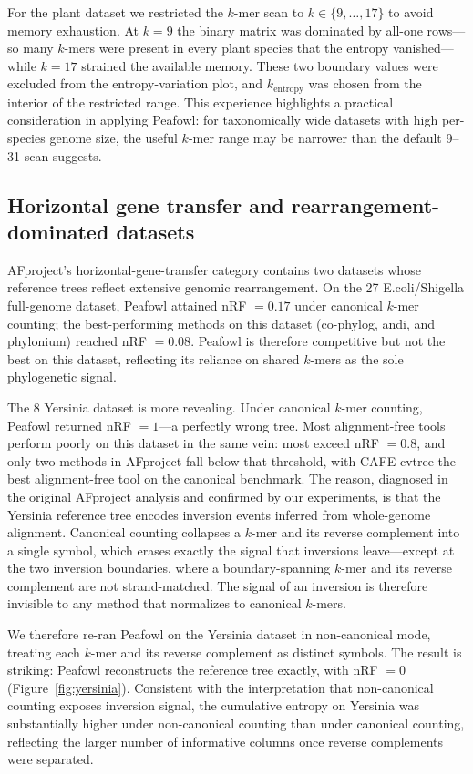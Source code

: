 \documentclass[11pt]{article}
\begin{document}
For the plant dataset we restricted the $k$-mer scan to $k \in \{9, \ldots, 17\}$
to avoid memory exhaustion. At $k = 9$ the binary matrix was dominated by
all-one rows---so many $k$-mers were present in every plant species that
the entropy vanished---while $k = 17$ strained the available memory. These
two boundary values were excluded from the entropy-variation plot, and
$k_\mathrm{entropy}$ was chosen from the interior of the restricted range.
This experience highlights a practical consideration in applying Peafowl:
for taxonomically wide datasets with high per-species genome size, the
useful $k$-mer range may be narrower than the default 9--31 scan suggests.

\subsection{Horizontal gene transfer and rearrangement-dominated datasets}

AFproject's horizontal-gene-transfer category contains two datasets whose
reference trees reflect extensive genomic rearrangement. On the 27
E.coli/Shigella full-genome dataset, Peafowl attained nRF $= 0.17$ under
canonical $k$-mer counting; the best-performing methods on this dataset
(co-phylog, andi, and phylonium) reached nRF $= 0.08$. Peafowl is therefore
competitive but not the best on this dataset, reflecting its reliance on
shared $k$-mers as the sole phylogenetic signal.

The 8 Yersinia dataset is more revealing. Under canonical $k$-mer counting,
Peafowl returned nRF $= 1$---a perfectly wrong tree. Most alignment-free
tools perform poorly on this dataset in the same vein: most exceed
nRF $= 0.8$, and only two methods in AFproject fall below that threshold,
with CAFE-cvtree the best alignment-free tool on the canonical benchmark.
The reason, diagnosed in the original AFproject analysis and confirmed by
our experiments, is that the Yersinia reference tree encodes inversion
events inferred from whole-genome alignment. Canonical counting collapses
a $k$-mer and its reverse complement into a single symbol, which erases
exactly the signal that inversions leave---except at the two inversion
boundaries, where a boundary-spanning $k$-mer and its reverse complement
are not strand-matched. The signal of an inversion is therefore invisible
to any method that normalizes to canonical $k$-mers.

We therefore re-ran Peafowl on the Yersinia dataset in non-canonical mode,
treating each $k$-mer and its reverse complement as distinct symbols. The
result is striking: Peafowl reconstructs the reference tree exactly, with
nRF $= 0$ (Figure~\ref{fig:yersinia}). Consistent with the interpretation
that non-canonical counting exposes inversion signal, the cumulative
entropy on Yersinia was substantially higher under non-canonical counting
than under canonical counting, reflecting the larger number of informative
columns once reverse complements were separated.
\end{document}
